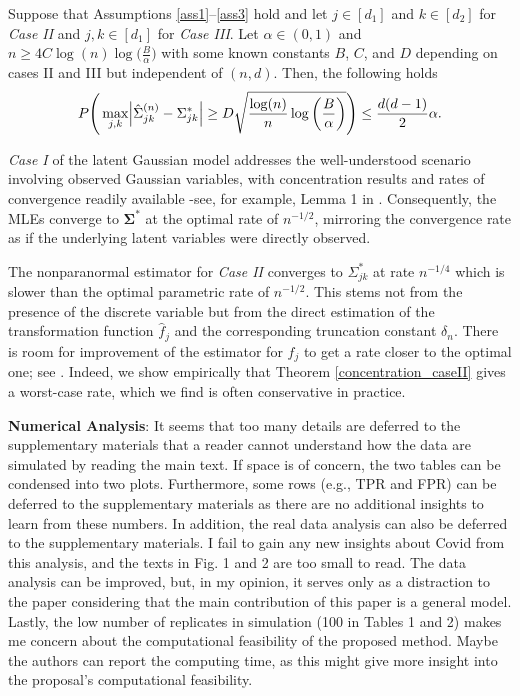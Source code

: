 \begin{change}
    \begin{theorem*}
        Suppose that Assumptions \ref{ass1}--\ref{ass3} hold and let $j \in [d_1]$ and $k \in [d_2]$ for  \textit{Case II} and $j,k \in [d_1]$ for \textit{Case III}. Let $\alpha \in (0,1)$ and \(n \geq 4 C \log(n) \log\Big(\frac{B}{\alpha}\Big)\) with some known constants $B$, $C$, and $D$ depending on cases II and III but independent of $(n,d)$. Then, the following holds
        \begin{equation}
            P\Bigg(\max_{j,k}\abs{\hat{\Sigma}_{jk}^{(n)} - \Sigma_{jk}^{*}} \geq D\sqrt{\frac{\log(n)}{n} \log\bigg(\frac{B}{\alpha}\bigg)}\Bigg) \leq \frac{d(d-1)}{2}\alpha.
        \end{equation}
    \end{theorem*}
    \textit{Case I} of the latent Gaussian model addresses the well-understood scenario involving observed Gaussian variables, with concentration results and rates of convergence readily available -see, for example, Lemma 1 in \citet{Ravikumar11}. Consequently, the MLEs converge to \(\mathbf{\Sigma}^{*}\) at the optimal rate of \(n^{-1/2}\), mirroring the convergence rate as if the underlying latent variables were directly observed.
\end{change}

\begin{change}
    The nonparanormal estimator for \textit{Case II} converges to \(\Sigma_{jk}^*\) at rate \(n^{-1/4}\) which is slower than the optimal parametric rate of \(n^{-1/2}\). This stems not from the presence of the discrete variable but from the direct estimation of the transformation function \(\hat{f}_j\) and the corresponding truncation constant \(\delta_n\). There is room for improvement of the estimator for \(f_j\) to get a rate closer to the optimal one; see \citep{Xue12}. Indeed, we show empirically that Theorem \ref{concentration_caseII} gives a worst-case rate, which we find is often conservative in practice.
\end{change}

\begin{point}
    \textbf{Numerical Analysis}: It seems that too many details are deferred to the supplementary materials that a reader cannot understand how the data are simulated by reading the main text. If space is of concern, the two tables can be condensed into two plots. Furthermore, some rows (e.g., TPR and FPR) can be deferred to the supplementary materials as there are no additional insights to learn from these numbers. In addition, the real data analysis can also be deferred to the supplementary materials. I fail to gain any new insights about Covid from this analysis, and the texts in Fig. 1 and 2 are too small to read. The data analysis can be improved, but, in my opinion, it serves only as a distraction to the paper considering that the main contribution of this paper is a general model. Lastly, the low number of replicates in simulation (100 in Tables 1 and 2) makes me concern about the computational feasibility of the proposed method. Maybe the authors can report the computing time, as this might give more insight into the proposal’s computational feasibility.
\end{point}

